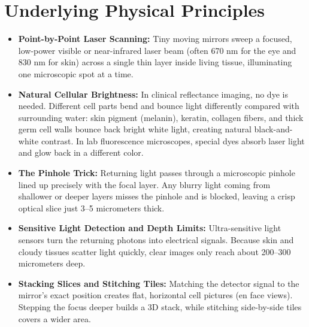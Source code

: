 \section{Underlying Physical Principles}
\begin{itemize}
    \item \textbf{Point-by-Point Laser Scanning:} Tiny moving mirrors sweep a focused, low-power visible or near-infrared laser beam (often 670 nm for the eye and 830 nm for skin) across a single thin layer inside living tissue, illuminating one microscopic spot at a time.
    \item \textbf{Natural Cellular Brightness:} In clinical reflectance imaging, no dye is needed. Different cell parts bend and bounce light differently compared with surrounding water: skin pigment (melanin), keratin, collagen fibers, and thick germ cell walls bounce back bright white light, creating natural black-and-white contrast. In lab fluorescence microscopes, special dyes absorb laser light and glow back in a different color.
    \item \textbf{The Pinhole Trick:} Returning light passes through a microscopic pinhole lined up precisely with the focal layer. Any blurry light coming from shallower or deeper layers misses the pinhole and is blocked, leaving a crisp optical slice just 3--5 micrometers thick.
    \item \textbf{Sensitive Light Detection and Depth Limits:} Ultra-sensitive light sensors turn the returning photons into electrical signals. Because skin and cloudy tissues scatter light quickly, clear images only reach about 200--300 micrometers deep.
    \item \textbf{Stacking Slices and Stitching Tiles:} Matching the detector signal to the mirror's exact position creates flat, horizontal cell pictures (en face views). Stepping the focus deeper builds a 3D stack, while stitching side-by-side tiles covers a wider area.
\end{itemize}

